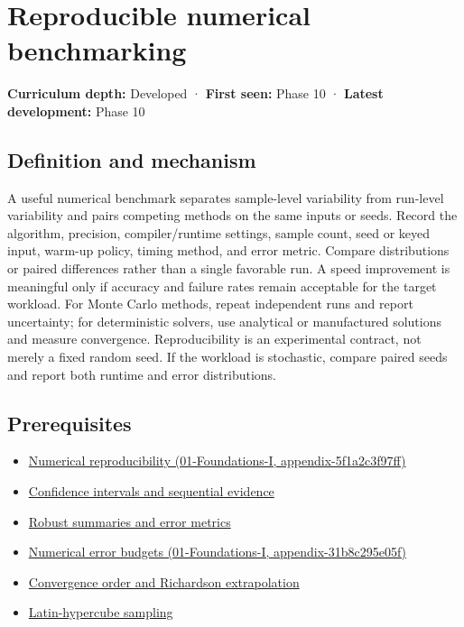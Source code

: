 \hypertarget{appendix-b9db93e28371}{}
\section{Reproducible numerical benchmarking}\label{appendix-b9db93e28371-reproducible-numerical-benchmarking}

\textbf{Curriculum depth:} Developed · \textbf{First seen:} Phase 10 · \textbf{Latest development:} Phase 10

\subsection{Definition and mechanism}\label{appendix-b9db93e28371-definition-and-mechanism}

A useful numerical benchmark separates sample-level variability from run-level variability and pairs competing methods on the same inputs or seeds. Record the algorithm, precision, compiler/runtime settings, sample count, seed or keyed input, warm-up policy, timing method, and error metric. Compare distributions or paired differences rather than a single favorable run. A speed improvement is meaningful only if accuracy and failure rates remain acceptable for the target workload. For Monte Carlo methods, repeat independent runs and report uncertainty; for deterministic solvers, use analytical or manufactured solutions and measure convergence. Reproducibility is an experimental contract, not merely a fixed random seed. If the workload is stochastic, compare paired seeds and report both runtime and error distributions.

\subsection{Prerequisites}\label{appendix-b9db93e28371-prerequisites}

\begin{itemize}
\tightlist
\item
  \href{../01-Foundations-I/main.pdf\#nameddest=appendix-5f1a2c3f97ff}{Numerical reproducibility (01-Foundations-I, appendix-5f1a2c3f97ff)}
\item
  \hyperref[appendix-c83016554b1e]{Confidence intervals and sequential evidence}
\item
  \hyperref[appendix-bcc44e9d3d02]{Robust summaries and error metrics}
\item
  \href{../01-Foundations-I/main.pdf\#nameddest=appendix-31b8c295e05f}{Numerical error budgets (01-Foundations-I, appendix-31b8c295e05f)}
\item
  \hyperref[appendix-aca80b6bf17a]{Convergence order and Richardson extrapolation}
\item
  \hyperref[appendix-1c5e85693a06]{Latin-hypercube sampling}
\end{itemize}

